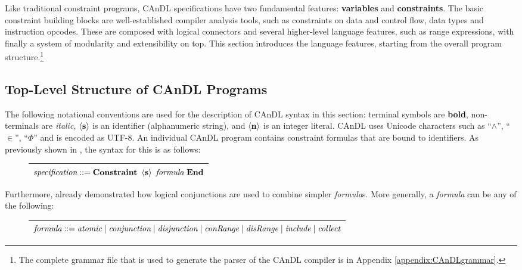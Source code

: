     Like traditional constraint programs, CAnDL specifications have two
    fundamental features: \textbf{variables} and \textbf{constraints}.
    The basic constraint building blocks are well-established compiler analysis
    tools, such as constraints on data and control flow, data types and
    instruction opcodes.
    These are composed with logical connectors and several higher-level language
    features, such as range expressions, with finally a system of modularity and
    extensibility on top.
    This section introduces the language features, starting from the overall
    program structure.\footnote{The complete grammar file that is used to
    generate the parser of the CAnDL compiler is in Appendix
    \ref{appendix:CAnDLgrammar}.}

\subsection{Top-Level Structure of CAnDL Programs}

    The following notational conventions are used for the description of CAnDL
    syntax in this section:
    terminal symbols are {\bf bold}, non-terminals are {\it italic},
    $\left<\text{\bf s}\right>$ is an identifier (alphanumeric string), and
    $\left<\text{\bf n}\right>$ is an integer literal.
    CAnDL uses Unicode characters such as ``$\land$'', ``$\in$'', ``$\Phi$'' and
    is encoded as UTF-8.
    An individual CAnDL program contains constraint formulas that are
    bound to identifiers.
    As previously shown in , the syntax for this is as
    follows:
\begin{figure}[H]
\centering
\begin{tabular}{|c|}
    \hline
    $\text{\it specification} ::= \text{\bf Constraint}\ \left<\text{\bf s}\right>\ \text{\it formula}\ \text{\bf End}$\\
    \hline
\end{tabular}
\end{figure}

    \noindent
    Furthermore,  already demonstrated how logical
    conjunctions are used to combine simpler {\it formula}s.
    More generally, a {\it formula} can be any of the following:
\begin{figure}[H]
\centering
\begin{tabular}{|c|}
    \hline
    $\text{\it formula} ::= \text{\it atomic}\mid\text{\it conjunction}\mid\text{\it disjunction}\mid\text{\it conRange}\mid \text{\it disRange}\mid\text{\it include}\mid\text{\it collect}$\\
    \hline
\end{tabular}
\end{figure}

